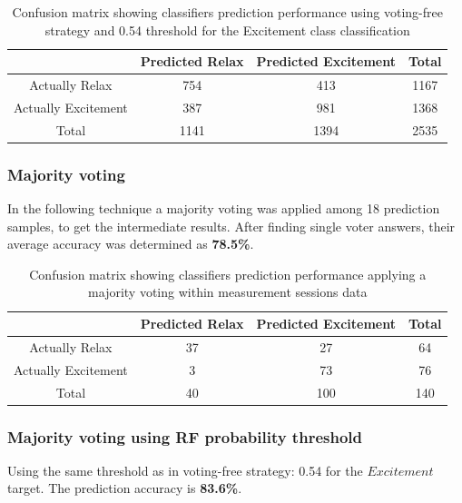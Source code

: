 \documentclass[12pt]{article}
\begin{document}
\begin{table}[H]
\caption{Confusion matrix showing classifiers prediction performance using voting-free strategy and 0.54 threshold for the Excitement class classification} \label{tab:title} 
\begin{center}
  \begin{tabular}{ | c | c | c | c | }
    \hline
     & Predicted Relax & Predicted Excitement & Total \\ \hline
    Actually Relax & 754 & 413 & 1167 \\ \hline
    Actually Excitement & 387 & 981 & 1368 \\ \hline
    Total & 1141 & 1394 & 2535 \\ 
    \hline
  \end{tabular}
\end{center}
\end{table}

\subsubsection{Majority voting}

In the following technique a majority voting was applied among 18 prediction samples, to get the intermediate results. After finding single voter answers, their average accuracy was determined as \textbf{78.5\%}.
\begin{table}[H]
\caption{Confusion matrix showing classifiers prediction performance applying a majority voting within measurement sessions data} \label{tab:title} 
\begin{center}
  \begin{tabular}{ | c | c | c | c | }
    \hline
     & Predicted Relax & Predicted Excitement & Total \\ \hline
    Actually Relax & 37 & 27 & 64 \\ \hline
    Actually Excitement & 3 & 73 & 76 \\ \hline
    Total & 40 & 100 & 140 \\ 
    \hline
  \end{tabular}
\end{center}
\end{table}

\subsubsection{Majority voting using RF probability threshold}

Using the same threshold as in voting-free strategy: 0.54 for the $Excitement$ target. The prediction accuracy is \textbf{83.6\%}.
\end{document}
